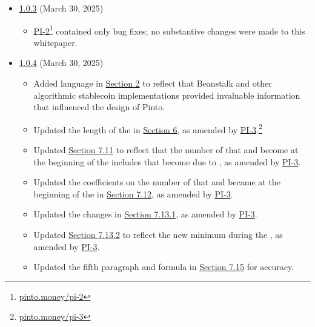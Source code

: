 \documentclass[class=article, crop=false]{standalone}
\begin{document}
\begin{itemize}[topsep=0pt, itemsep=3pt,leftmargin=16pt]
    \item \href{https://github.com/pinto-org/whitepaper/blob/master/version-history/pinto1_0_3.pdf}{1.0.3} (March 30, 2025)
    
    \begin{itemize}
        \item \href{https://pinto.money/pi-2}{PI-2}\footnote{\href{https://pinto.money/pi-2}{pinto.money/pi-2}} contained only bug fixes; no substantive changes were made to this whitepaper.
    \end{itemize}

    \item \href{https://github.com/pinto-org/whitepaper/blob/master/version-history/pinto1_0_4.pdf}{1.0.4} (March 30, 2025)
    
    \begin{itemize}
        \item Added language in \hyperlink{section.2}{Section 2} to reflect that Beanstalk and other algorithmic stablecoin implementations provided invaluable information that influenced the design of Pinto.
        \item Updated the length of the  in \hyperlink{section.6}{Section 6}, as amended by \href{https://pinto.money/pi-3}{PI-3}.\footnote{\href{https://pinto.money/pi-3}{pinto.money/pi-3}}
        \item Updated \hyperlink{subsection.7.11}{Section 7.11} to reflect that the number of  that  and become  at the beginning of the  includes  that become  due to , as amended by \href{https://pinto.money/pi-3}{PI-3}.
        \item Updated the coefficients on the number of  that  and became  at the beginning of the  in \hyperlink{subsection.7.12}{Section 7.12}, as amended by \href{https://pinto.money/pi-3}{PI-3}.
        \item Updated the  changes in \hyperlink{subsubsection.7.13.1}{Section 7.13.1}, as amended by \href{https://pinto.money/pi-3}{PI-3}.
        \item Updated \hyperlink{subsubsection.7.13.2}{Section 7.13.2} to reflect the new minimum  during the , as amended by \href{https://pinto.money/pi-3}{PI-3}.
        \item Updated the fifth paragraph and formula in \href{https://github.com/pinto-org/whitepaper/blob/master/version-history/pinto1_0_4.pdf}{Section 7.15} for accuracy.

\end{itemize}
\end{itemize}
\end{document}
